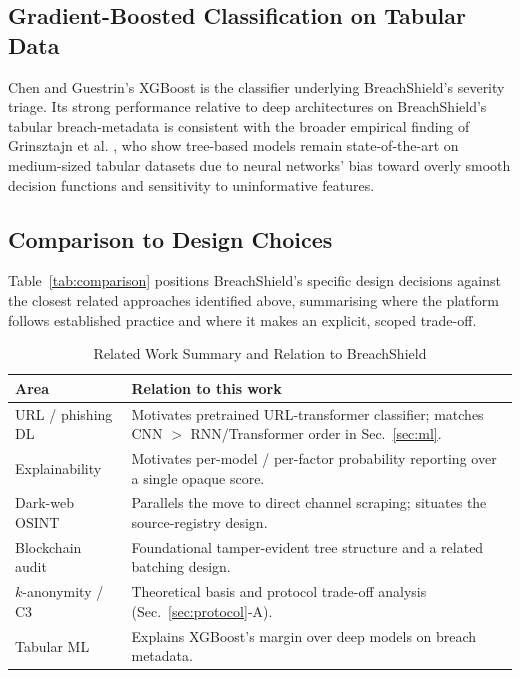 \documentclass[conference]{IEEEtran}
\begin{document}
\subsection{Gradient-Boosted Classification on Tabular Data}
Chen and Guestrin's XGBoost \cite{chen2016xgboost} is the classifier underlying BreachShield's severity triage. Its strong performance relative to deep architectures on BreachShield's tabular breach-metadata is consistent with the broader empirical finding of Grinsztajn et al. \cite{grinsztajn2022why}, who show tree-based models remain state-of-the-art on medium-sized tabular datasets due to neural networks' bias toward overly smooth decision functions and sensitivity to uninformative features.

\subsection{Comparison to Design Choices}
Table~\ref{tab:comparison} positions BreachShield's specific design decisions against the closest related approaches identified above, summarising where the platform follows established practice and where it makes an explicit, scoped trade-off.

\begin{table}[htbp]
\caption{Related Work Summary and Relation to BreachShield}
\label{tab:relwork}
\centering
\scriptsize
\begin{tabular}{lp{5.2cm}}
\toprule
\textbf{Area} & \textbf{Relation to this work} \\
\midrule
URL / phishing DL \cite{aljofey2020effective,sahingoz2024dephides} & Motivates pretrained URL-transformer classifier; matches CNN $>$ RNN/Transformer order in Sec.~\ref{sec:ml}. \\
Explainability \cite{pavani2024enhancing,tawfik2025explainable} & Motivates per-model / per-factor probability reporting over a single opaque score. \\
Dark-web OSINT \cite{kuhn2024navigating,saleem2022anonymity,pastor2020not} & Parallels the move to direct channel scraping; situates the source-registry design. \\
Blockchain audit \cite{arabnouri2024secure,merkle1988digital,crosby2009efficient} & Foundational tamper-evident tree structure and a related batching design. \\
$k$-anonymity / C3 \cite{sweeney2002k,li2019protocols,elemam2008protecting} & Theoretical basis and protocol trade-off analysis (Sec.~\ref{sec:protocol}-A). \\
Tabular ML \cite{chen2016xgboost,grinsztajn2022why} & Explains XGBoost's margin over deep models on breach metadata. \\
\bottomrule
\end{tabular}
\end{table}
\end{document}
